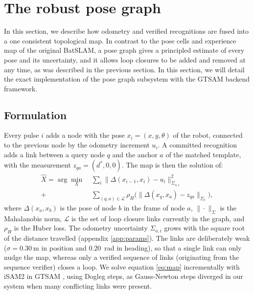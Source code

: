 \section{The robust pose graph}
\label{sec:backend}
In this section, we describe how odometry and verified recognitions are fused into a one consistent topological map. In contrast to the pose cells and experience map of the original BatSLAM, a pose graph gives a principled estimate of every pose and its uncertainty, and it allows loop closures to be added and removed at any time, as was described in the previous section. In this section, we will detail the exact implementation of the pose graph subsystem with the GTSAM backend framework.

\subsection{Formulation}
Every pulse $i$ adds a node with the pose $x_i = (x, y, \theta)$ of the robot, connected to the previous node by the odometry increment $u_i$. A committed recognition adds a link between a query node $q$ and the anchor $a$ of the matched template, with the measurement $z_{qa} = (d^*, 0, 0)$. The map is then the solution of:
\begin{equation}
\begin{aligned}
\hat{X} = \arg\min_{X} \; & \sum_{i} \big\| \Delta(x_{i-1}, x_i) - u_i \big\|^2_{\Sigma_{o,i}} \\
+ & \sum_{(q,a) \in \mathcal{L}} \rho_H\Big( \big\| \Delta(x_q, x_a) - z_{qa} \big\|_{\Sigma_\ell} \Big),
\end{aligned}
\label{eq:map}
\end{equation}
%
where $\Delta(x_a, x_b)$ is the pose of node $b$ in the frame of node $a$, $\|\cdot\|_\Sigma$ is the Mahalanobis norm, $\mathcal{L}$ is the set of loop closure links currently in the graph, and $\rho_H$ is the Huber loss. The odometry uncertainty $\Sigma_{o,i}$ grows with the square root of the distance travelled (appendix \ref{app:params}). The links are deliberately weak ($\sigma = \SI{0.30}{\meter}$ in position and \SI{0.20}{\radian} in heading), so that a single link can only nudge the map, whereas only a verified sequence of links (originating from the sequence verifier) closes a loop. We solve equation \ref{eq:map} incrementally with iSAM2 \cite{kaessISAM2IncrementalSmoothing2012} in GTSAM \cite{dellaertFactorGraphsGTSAM2012}, using Dogleg steps, as Gauss-Newton steps diverged in our system when many conflicting links were present.

